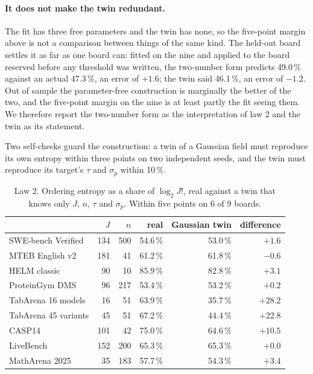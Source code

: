 \documentclass[10pt]{article}
\begin{document}
\paragraph{It does not make the twin redundant.} The fit has three free
parameters and the twin has none, so the five-point margin above is not a
comparison between things of the same kind. The held-out board settles it as
far as one board can: fitted on the nine and applied to the board reserved
before any threshold was written, the two-number form predicts 49.0\,\%
against an actual 47.3\,\%, an error of $+1.6$; the twin said 46.1\,\%, an
error of $-1.2$. Out of sample the parameter-free construction is
marginally the better of the two, and the five-point margin on the nine is
at least partly the fit seeing them. We therefore report the two-number form
as the interpretation of law 2 and the twin as its statement.

Two self-checks guard the construction: a twin of a Gaussian field must
reproduce its own entropy within three points on two independent seeds, and
the twin must reproduce its target's $\tau$ and $\sigma_p$ within 10\,\%.

\begin{table}[t]\centering\small
\begin{tabular}{l rr rrr}
\toprule
 & $J$ & $n$ & real & Gaussian twin & difference \\
\midrule
SWE-bench Verified & 134 & 500 & 54.6\,\% & 53.0\,\% & $+1.6$ \\
MTEB English v2 & 181 & 41 & 61.2\,\% & 61.8\,\% & $-0.6$ \\
HELM classic & 90 & 10 & 85.9\,\% & 82.8\,\% & $+3.1$ \\
ProteinGym DMS & 96 & 217 & 53.4\,\% & 53.2\,\% & $+0.2$ \\
TabArena 16 models & 16 & 51 & 63.9\,\% & 35.7\,\% & $+28.2$ \\
TabArena 45 variants & 45 & 51 & 67.2\,\% & 44.4\,\% & $+22.8$ \\
CASP14 & 101 & 42 & 75.0\,\% & 64.6\,\% & $+10.5$ \\
LiveBench & 152 & 200 & 65.3\,\% & 65.3\,\% & $+0.0$ \\
MathArena 2025 & 35 & 183 & 57.7\,\% & 54.3\,\% & $+3.4$ \\
\bottomrule
\end{tabular}
\caption{Law 2. Ordering entropy as a share of $\log_2 J!$, real against a twin that knows only $J$, $n$, $\tau$ and $\sigma_p$. Within five points on 6 of 9 boards.}
\label{tab:law2}
\end{table}
\end{document}
